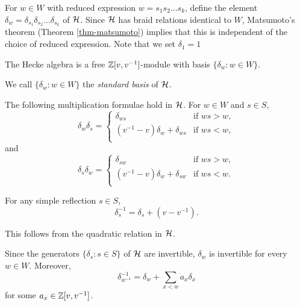 For $w \in W$ with reduced expression $w = s_1 s_2 ... s_k$, define the element $\delta_w = \delta_{s_1}  \delta_{s_2} ... \delta_{s_k}$ of $\mathcal{H}$. Since $\mathcal{H}$ has braid relations identical to $W$, Matsumoto's theorem (Theorem \ref{thm-matsumoto}) implies that this is independent of the choice of reduced expression. Note that we set $\delta_1 = 1$


\begin{theorem}
    The Hecke algebra is a free $\mathbb{Z}[v,v^{-1}]$-module with basis $\{\delta_w : w \in W\}$.
\end{theorem}

\begin{definition}
    We call $\{\delta_w : w \in W\}$ the \textit{standard basis} of $\mathcal{H}$.
\end{definition}


\begin{proposition}
    The following multiplication formulae hold in $\mathcal{H}$. For $w \in W$ and $s \in S$,
    \[
        \delta_w \delta_s =
        \begin{cases}
            \delta_{ws}                        & \text{if } ws > w, \\
            (v^{-1} - v)\delta_w + \delta_{ws} & \text{if } ws < w, \\
        \end{cases}
    \]
    and
    \[
        \delta_s \delta_w =
        \begin{cases}
            \delta_{sw}                        & \text{if } ws > w, \\
            (v^{-1} - v)\delta_w + \delta_{sw} & \text{if } ws < w. \\
        \end{cases}
    \]
\end{proposition}

\begin{proposition}
    For any simple reflection $s \in S$,
    \[
        \delta_s^{-1} = \delta_s + (v - v^{-1}).
    \]
\end{proposition}
This follows from the quadratic relation in $\mathcal{H}$.

\n

\begin{proposition}
    Since the generators $\{\delta_s : s \in S\}$ of $\mathcal{H}$ are invertible, $\delta_w$ is invertible for every $w \in W$. Moreover,
    \[
        \delta_{w^{-1}}^{-1} = \delta_w + \sum_{x < w} a_x \delta_x
    \]
    for some $a_x \in \mathbb{Z}[v,v^{-1}]$.
\end{proposition}

